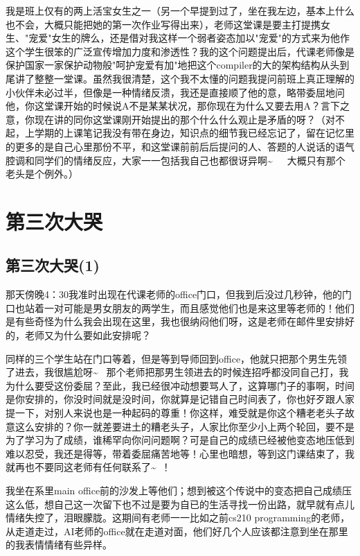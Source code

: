\documentclass[12pt]{book}
\begin{document}
我是班上仅有的两上活宝女生之一（另一个早提到过了，坐在我左边，基本上什么也不会，大概只能把她的第一次作业写得出来），老师这堂课是要主打提携女生、"宠爱"女生的牌么，还是借对我这样一个弱者姿态加以"宠爱"的方式来为他作这个学生很笨的广泛宣传增加力度和渗透性？我的这个问题提出后，代课老师像是保护国家一家保护动物般"呵护宠爱有加"地把这个compiler的大的架构结构从头到尾讲了整整一堂课。虽然我很清楚，这个我不太懂的问题我提问前班上真正理解的小伙伴未必过半，但像是一种情绪反溃，我还是直接顺了他的意，略带委屈地问他，你这堂课开始的时候说A不是某某状况，那你现在为什么又要去用A？言下之意，你现在讲的同你这堂课刚开始提出的那个什么什么观止是矛盾的呀？（对不起，上学期的上课笔记我没有带在身边，知识点的细节我已经忘记了，留在记忆里的更多的是自己心里那份不平，和这堂课前前后后提问的人、答题的人说话的语气腔调和同学们的情绪反应，大家一一包括我自己也都很讶异啊\textasciitilde{}~　大概只有那个老头是个例外。）

\chapter{第三次大哭}
\label{sec-43}
\section{第三次大哭(1)}
\label{sec-43-1}

那天傍晚4：30我准时出现在代课老师的office门口，但我到后没过几秒钟，他的门口也站着一对可能是男女朋友的两学生，而且感觉他们也是来这里等老师的！他们是有些奇怪为什么我会出现在这里，我也很纳闷他们呀，这是老师在邮件里安排好的，老师又为什么要如此安排呢？

同样的三个学生站在门口等着，但是等到导师回到office，他就只把那个男生先领了进去，我很尴尬呀\textasciitilde{}~ 那个老师把那男生领进去的时候连招呼都没同自己打，我为什么要受这份委屈？至此，我已经很冲动想要骂人了，这算哪门子的事啊，时间是你安排的，你没时间就是没时间，你就算是记错自己时间表了，你也好歹跟人家提一下，对别人来说也是一种起码的尊重！你这样，难受就是你这个糟老老头子故意这么安排的？你一就差要进土的糟老头子，人家比你至少小上两个轮回，要不是为了学习为了成绩，谁稀罕向你问问题啊？可是自己的成绩已经被他变态地压低到难以忍受，我还是得等，带着委屈痛苦地等！心里也暗想，等到这门课结束了，我就再也不要同这老师有任何联系了\textasciitilde{}~！

我坐在系里main office前的沙发上等他们；想到被这个传说中的变态把自己成绩压这么低，想自己这一次留下也不过是要为自已的生活寻找一份出路，就早就有点儿情绪失控了，泪眼朦胧。这期间有老师一一比如之前cs210 programming的老师，从走道走过，AI老师的office就在走道对面，他们好几个人应该都注意到坐在那里的我表情情绪有些异样。
\end{document}
